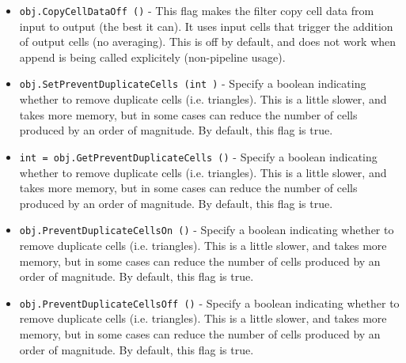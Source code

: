 \begin{itemize}
\item  \verb|obj.CopyCellDataOff ()| -  This flag makes the filter copy cell data from input to output 
 (the best it can).  It uses input cells that trigger the addition
 of output cells (no averaging).  This is off by default, and does
 not work when append is being called explicitely (non-pipeline usage).

\item  \verb|obj.SetPreventDuplicateCells (int )| -  Specify a boolean indicating whether to remove duplicate cells
 (i.e. triangles).  This is a little slower, and takes more memory, but
 in some cases can reduce the number of cells produced by an order of
 magnitude. By default, this flag is true.

\item  \verb|int = obj.GetPreventDuplicateCells ()| -  Specify a boolean indicating whether to remove duplicate cells
 (i.e. triangles).  This is a little slower, and takes more memory, but
 in some cases can reduce the number of cells produced by an order of
 magnitude. By default, this flag is true.

\item  \verb|obj.PreventDuplicateCellsOn ()| -  Specify a boolean indicating whether to remove duplicate cells
 (i.e. triangles).  This is a little slower, and takes more memory, but
 in some cases can reduce the number of cells produced by an order of
 magnitude. By default, this flag is true.

\item  \verb|obj.PreventDuplicateCellsOff ()| -  Specify a boolean indicating whether to remove duplicate cells
 (i.e. triangles).  This is a little slower, and takes more memory, but
 in some cases can reduce the number of cells produced by an order of
 magnitude. By default, this flag is true.

\end{itemize}
